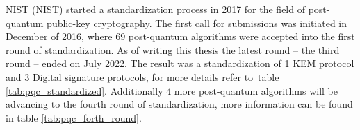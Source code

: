 NIST (\acl{NIST}) started a standardization process in 2017 for the field of post-quantum public-key cryptography. The first call for submissions was initiated in December of 2016, where 69 post-quantum algorithms were accepted into the first round of standardization. As of writing this thesis the latest round -- the third round -- ended on July 2022. The result was a standardization of 1 KEM protocol and 3 Digital signature protocols, for more details refer to~table \ref{tab:pqc_standardized}. Additionally 4 more post-quantum algorithms will be advancing to the fourth round of standardization, more information can be found in table \ref{tab:pqc_forth_round}. \cite{Alagic2022}

